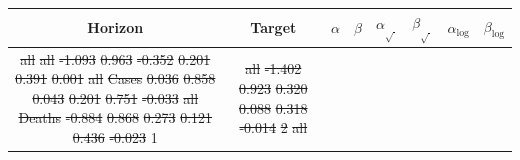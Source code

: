 \documentclass{article}
\providecommand{\DIFdeltex}[1]{{\protect\color{red}\sout{#1}}}                      %
\providecommand{\DIFdelFL}[1]{\DIFdel{#1}} %
\providecommand{\DIFdelbeginFL}{} %
\providecommand{\DIFdelendFL}{} %
\providecommand{\DIFdel}[1]{\texorpdfstring{\DIFdeltex{#1}}{}} %
\newcommand{\DIFscaledelfig}{0.5}
\newlength{\DIFdelgraphicswidth} %
\newlength{\DIFdelgraphicsheight} %
\newcommand{\DIFdelincludegraphics}[2][]{%
\sbox{\DIFdelgraphicsbox}{\DIFOincludegraphics[#1]{#2}}%
\settoboxwidth{\DIFdelgraphicswidth}{\DIFdelgraphicsbox} %
\settoboxtotalheight{\DIFdelgraphicsheight}{\DIFdelgraphicsbox} %
\scalebox{\DIFscaledelfig}{%
\parbox[b]{\DIFdelgraphicswidth}{\usebox{\DIFdelgraphicsbox}\\[-\baselineskip] \rule{\DIFdelgraphicswidth}{0em}}\llap{\resizebox{\DIFdelgraphicswidth}{\DIFdelgraphicsheight}{%
\setlength{\unitlength}{\DIFdelgraphicswidth}%
\begin{picture}(1,1)%
\thicklines\linethickness{2pt} %
{\color[rgb]{1,0,0}\put(0,0){\framebox(1,1){}}}%
{\color[rgb]{1,0,0}\put(0,0){\line( 1,1){1}}}%
{\color[rgb]{1,0,0}\put(0,1){\line(1,-1){1}}}%
\end{picture}%
}\hspace*{3pt}}} %
} %
\DeclareRobustCommand{\DIFdelbeginFL}{\DIFOdelbeginFL \let\includegraphics\DIFdelincludegraphics} %
\DeclareRobustCommand{\DIFdelendFL}{\DIFOaddendFL \let\includegraphics\DIFOincludegraphics} %
\begin{document}
\begin{table}
\centering
\begin{tabular}{ccrrrrrr}
\toprule
Horizon & Target & $\alpha$ & $\beta$ & $\alpha_{\sqrt{~}}$ & $\beta_{\sqrt{~}}$ & $\alpha_{\log}$ & $\beta_{\log}$ \\
\midrule
\DIFdelbeginFL \DIFdelFL{all }%
\DIFdelFL{all }%
\DIFdelFL{-1.093 }%
\DIFdelFL{0.963 }%
\DIFdelFL{-0.352 }%
\DIFdelFL{0.201 }%
\DIFdelFL{0.391 }%
\DIFdelFL{0.001}%
\DIFdelFL{all }%
\DIFdelFL{Cases }%
\DIFdelFL{0.036 }%
\DIFdelFL{0.858 }%
\DIFdelFL{0.043 }%
\DIFdelFL{0.201 }%
\DIFdelFL{0.751 }%
\DIFdelFL{-0.033}%
\DIFdelFL{all }%
\DIFdelFL{Deaths }%
\DIFdelFL{-0.884 }%
\DIFdelFL{0.868 }%
\DIFdelFL{0.273 }%
\DIFdelFL{0.121 }%
\DIFdelFL{0.436 }%
\DIFdelFL{-0.023}%
\DIFdelendFL %
1 & \DIFdelbeginFL \DIFdelFL{all }%
\DIFdelFL{-1.402 }%
\DIFdelFL{0.923 }%
\DIFdelFL{0.320 }%
\DIFdelFL{0.088 }%
\DIFdelFL{0.318 }%
\DIFdelFL{-0.014}%
\DIFdelFL{2 }%
\DIFdelFL{all }%

\end{tabular}
\end{table}
\end{document}
